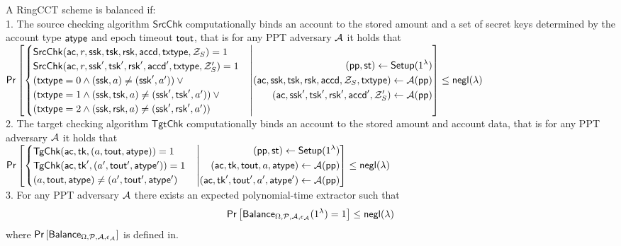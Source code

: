 \begin{definition}[Balance] A RingCCT scheme is balanced if: \\
1. The source checking algorithm $\mathsf{SrcChk}$ computationally binds an account to the stored amount and a set of secret keys determined by the account type $\mathsf{atype}$ and epoch timeout $\mathsf{tout}$, that is for any PPT adversary $\mathcal{A}$ it holds that 
\vspace{0.3cm} \\
$\mathsf{Pr}\left[
    \begin{cases} 
	    \mathsf{SrcChk}(\mathsf{ac}, r, \ssk, \tsk, \rsk, \mathsf{accd}, \txtype, \mathcal{Z}_{S}) = 1 \tabularnewline
	\mathsf{SrcChk}(\mathsf{ac}, r, \ssk', \tsk', \rsk', \mathsf{accd}',\txtype, \mathcal{Z}_{S}') = 1 \tabularnewline
	(\txtype = 0 \land (\ssk, a) \neq (\ssk', a')) \: \lor \tabularnewline 
	(\txtype = 1 \land (\ssk, \tsk, a) \neq (\ssk', \tsk', a')) \: \lor \tabularnewline
	(\txtype = 2 \land (\ssk, \rsk, a) \neq (\ssk', \rsk', a'))
    \end{cases} 
    \middle|
    \begin{aligned}
	(\pp, \st) \gets \mathsf{Setup}(1^\lambda) \\
	(\mathsf{ac}, \ssk, \tsk, \rsk, \accd, \mathcal{Z}_{S}, \txtype) \gets \mathcal{A}(\pp) \\
	(\mathsf{ac}, \ssk', \tsk', \rsk', \accd',  \mathcal{Z}_{S}') \gets \mathcal{A}(\pp) \\
    \end{aligned}
\right]
\leq \negl
$ 
\vspace{0.3cm} \\
2. The target checking algorithm $\mathsf{TgtChk}$ computationally binds an account to the stored amount and account data, that is for any PPT adversary $\mathcal{A}$ it holds that
\vspace{0.3cm} \\
$\mathsf{Pr}\left[
    \begin{cases} 
	\mathsf{TgChk}(\mathsf{ac}, \mathsf{tk}, (a, \tout, \atype)) = 1 \tabularnewline
	\mathsf{TgChk}(\mathsf{ac}, \mathsf{tk}', (a', \tout', \atype')) = 1 \tabularnewline
	(a, \tout, \atype) \neq (a', \tout', \atype')
    \end{cases} 
    \middle|
    \begin{aligned}
	(\pp, \st) \gets \mathsf{Setup}(1^\lambda) \\
	(\mathsf{ac}, \mathsf{tk}, \tout, a, \atype) \gets \mathcal{A}(\pp) \\
	(\mathsf{ac}, \mathsf{tk}', \tout', a', \atype') \gets \mathcal{A}(\pp) \\
    \end{aligned}
\right]
\leq \negl
$ 
\vspace{0.3cm} \\
3. For any PPT adversary $\mathcal{A}$ there exists an expected polynomial-time extractor such that
\begin{equation*}
\mathsf{Pr}\left[\mathsf{Balance}_{\Omega,\mathcal{P},\adv,\epsilon_\adv}(1^\lambda) = 1\right] \leq \negl
\end{equation*}
where $\mathsf{Pr}\left[\mathsf{Balance}_{\Omega,\mathcal{P},\mathcal{A},\epsilon_{\mathcal{A}}}\right]$ is defined in.\\
\end{definition}
